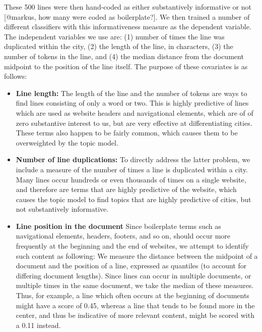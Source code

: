\documentclass[11pt]{article}
\begin{document}
These 500 lines were then hand-coded as either substantively informative or not [@markus, how many were coded as boilerplate?]. We then trained a number of different classifiers with this informativeness measure as the dependent variable. The independent variables we use are: (1) number of times the line was duplicated within the city, (2) the length of the line, in characters, (3) the number of tokens in the line, and (4) the median distance from the document midpoint to the position of the line itself. The purpose of these covariates is as follows:

\begin{itemize}
\item {\bf Line length:} The length of the line and the number of tokens are ways to find lines consisting of only a word or two. This is highly predictive of lines which are used as website headers and navigational elements, which are of of zero substantive interest to us, but are very effective at differentiating cities. These terms also happen to be fairly common, which causes them to be overweighted by the topic model.

\item {\bf Number of line duplications:} To directly address the latter problem, we include a measure of the number of times a line is duplicated within a city. Many lines occur hundreds or even thousands of times on a single website, and therefore are terms that are highly predictive of the website, which causes the topic model to find topics that are highly predictive of cities, but not substantively informative.

\item {\bf Line position in the document} Since boilerplate terms such as navigational elements, headers, footers, and so on, should occur more frequently at the beginning and the end of websites, we attempt to identify such content as following: We measure the distance between the midpoint of a document and the position of a line, expressed as quantiles (to account for differing document lengths). Since lines can occur in multiple documents, or multiple times in the same document, we take the median of these measures. Thus, for example, a line which often occurs at the beginning of documents might have a score of 0.45, whereas a line that tends to be found more in the center, and thus be indicative of more relevant content, might be scored with a 0.11 instead.
\end{itemize}


\end{document}
